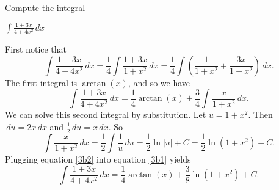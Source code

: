 \documentclass[nooutcomes, handout]{ximera}
\renewcommand{\d}{\,d}
\begin{document}
\begin{problem}
Compute the integral

		
		
		
	  $ \int \frac{1+3x}{4+4x^2} \d x$
		\begin{freeResponse}
		First notice that
			\begin{equation*}
			\int \frac{1+3x}{4+4x^2} \d x = \frac{1}{4} \int \frac{1+3x}{1+x^2} \d x = \frac{1}{4} \int \left( \frac{1}{1+x^2} + \frac{3x}{1+x^2} \right) \d x.
			\end{equation*}
		The first integral is $\arctan(x)$, and so we have
			\begin{equation}\label{3b1}
			\int \frac{1+3x}{4+4x^2} \d x = \frac{1}{4} \arctan(x) + \frac{3}{4} \int \frac{x}{1+x^2} \d x.
			\end{equation}
		We can solve this second integral by substitution.  Let $u=1+x^2$.  Then $\d u = 2x \d x$ and $\frac{1}{2} \d u = x \d x$.  So
			\begin{equation}\label{3b2}
			\int \frac{x}{1+x^2} \d x = \frac{1}{2} \int \frac{1}{u} \d u = \frac{1}{2} \ln|u| +C = \frac{1}{2} \ln(1+x^2) + C.
			\end{equation}
		Plugging equation \eqref{3b2} into equation \eqref{3b1} yields
			\begin{equation*}
			\int \frac{1+3x}{4+4x^2} \d x = \frac{1}{4} \arctan(x) + \frac{3}{8} \ln(1+x^2) + C.
			\end{equation*}
		\end{freeResponse}
		
		
		
	
			
			
		
\end{problem}
\end{document}
